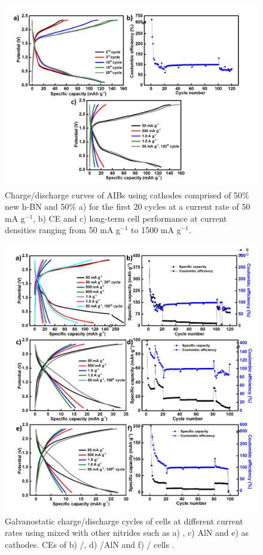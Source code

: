 \begin{figure}[tbh!]
\centering
\includegraphics[width=\textwidth]{Figures/BOhBN/hBNBO5050}
\caption{Charge/discharge curves of AIBs using cathodes comprised of 50\% new h-BN and 50\%  a) for the first 20 cycles at a current rate of 50 mA g$^{-1}$, b) CE and c) long-term cell performance at current densities ranging from 50 mA g$^{-1}$ to 1500 mA g$^{-1}$.}
\label{Figures/BOhBN:hBNBO5050}
\end{figure}

\begin{figure}[tbh!]
\centering
\includegraphics[width=\textwidth]{Figures/BOhBN/Bonit}
\caption{Galvanostatic charge/discharge cycles of cells at different current rates using  mixed with other nitrides such as a) , c) AlN and e)  as cathodes. CEs of b) /, d) /AlN and f) / cells .}
\label{Figures/BOhBN:Bonit}
\end{figure}

